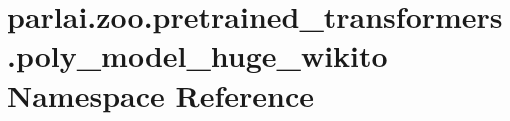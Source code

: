 \hypertarget{namespaceparlai_1_1zoo_1_1pretrained__transformers_1_1poly__model__huge__wikito}{}\section{parlai.\+zoo.\+pretrained\+\_\+transformers.\+poly\+\_\+model\+\_\+huge\+\_\+wikito Namespace Reference}
\label{namespaceparlai_1_1zoo_1_1pretrained__transformers_1_1poly__model__huge__wikito}
